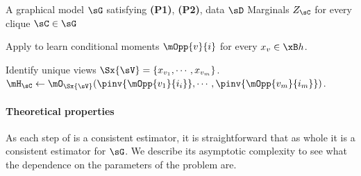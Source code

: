 \renewcommand{\algorithmicrequire}{\textbf{Input:}}
\renewcommand{\algorithmicensure}{\textbf{Output:}}
\begin{algorithm}
  \caption{\LearnMarginals}
  \label{algo:directed}
  \begin{algorithmic}
    \REQUIRE A graphical model $\sG$ satisfying \textbf{(P1)}, \textbf{(P2)}, data $\sD$
    \ENSURE Marginals $Z_\sC$ for every clique $\sC \in \sG$

        \STATE Apply \TensorFactorize to learn conditional moments
        $\mOpp{v}{i}$ for every $x_v \in \xB h$.

      \ENDFOR
\STATE Identify unique views $\Sx{\sV} = \{x_{v_1}, \cdots, x_{v_m}\}$.
\STATE $\mH_\sC \gets \mO_{\Sx{\sV}}( \pinv{\mOpp{v_1}{i_i}}, \cdots, \pinv{\mOpp{v_m}{i_m}} )$.
      \ENDFOR
  \end{algorithmic}
\end{algorithm}

\paragraph{Theoretical properties}

As each step of \LearnMarginals is a consistent estimator, it is
  straightforward that as whole it is a consistent estimator for $\sG$.
We describe its asymptotic complexity to see what the dependence on the
  parameters of the problem are.

